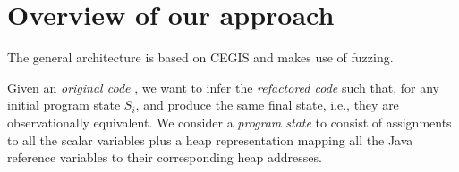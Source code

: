 \documentclass[runningheads,a4paper]{llncs}
\begin{document}

\section{Overview of our approach} \label{sec:approach}

The general architecture is based on CEGIS and makes use of fuzzing. 

Given an {\em original code} , we want to infer the 
{\em refactored code}  such that, for any initial program state
$S_i$,  and  produce the same final
state, i.e., they are observationally equivalent.
We consider a {\em program state} to consist of  
assignments to all the scalar variables plus a
heap representation mapping all the Java reference variables 
to their corresponding heap addresses.
%
%
\end{document}
